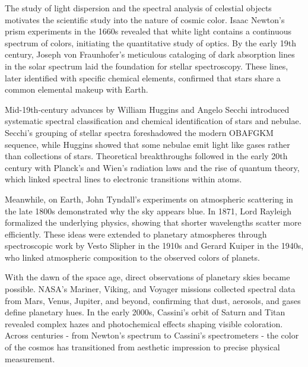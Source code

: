 \begin{historical}
The study of light dispersion and the spectral analysis of celestial objects motivates the scientific study into the nature of cosmic color. Isaac Newton's prism experiments in the 1660s revealed that white light contains a continuous spectrum of colors, initiating the quantitative study of optics. By the early 19th century, Joseph von Fraunhofer's meticulous cataloging of dark absorption lines in the solar spectrum laid the foundation for stellar spectroscopy. These lines, later identified with specific chemical elements, confirmed that stars share a common elemental makeup with Earth.

Mid-19th-century advances by William Huggins and Angelo Secchi introduced systematic spectral classification and chemical identification of stars and nebulae. Secchi's grouping of stellar spectra foreshadowed the modern OBAFGKM sequence, while Huggins showed that some nebulae emit light like gases rather than collections of stars. Theoretical breakthroughs followed in the early 20th century with Planck's and Wien's radiation laws and the rise of quantum theory, which linked spectral lines to electronic transitions within atoms.

Meanwhile, on Earth, John Tyndall's experiments on atmospheric scattering in the late 1800s demonstrated why the sky appears blue. In 1871, Lord Rayleigh formalized the underlying physics, showing that shorter wavelengths scatter more efficiently. These ideas were extended to planetary atmospheres through spectroscopic work by Vesto Slipher in the 1910s and Gerard Kuiper in the 1940s, who linked atmospheric composition to the observed colors of planets.

With the dawn of the space age, direct observations of planetary skies became possible. NASA's Mariner, Viking, and Voyager missions collected spectral data from Mars, Venus, Jupiter, and beyond, confirming that dust, aerosols, and gases define planetary hues. In the early 2000s, Cassini's orbit of Saturn and Titan revealed complex hazes and photochemical effects shaping visible coloration. Across centuries - from Newton's spectrum to Cassini's spectrometers - the color of the cosmos has transitioned from aesthetic impression to precise physical measurement.
\end{historical}
